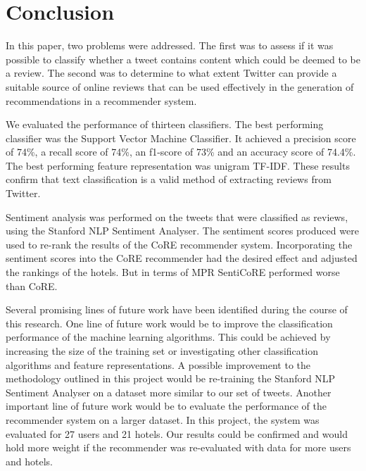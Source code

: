 \section{Conclusion}

In this paper, two problems were addressed. The first was to assess if it was possible to classify whether a tweet contains content which could be deemed to be a review. The second was to determine to what extent Twitter can provide a suitable source of online reviews that can be used effectively in the generation of recommendations in a recommender system.

We evaluated the performance of thirteen classifiers. The best performing classifier was the Support Vector Machine Classifier. It achieved a precision score of 74\%, a recall score of 74\%, an f1-score of 73\% and an accuracy score of 74.4\%. The best performing feature representation was unigram TF-IDF. These results confirm that text classification is a valid method of extracting reviews from Twitter. 

Sentiment analysis was performed on the tweets that were classified as reviews, using the Stanford NLP Sentiment Analyser. The sentiment scores produced were used to re-rank the results of the CoRE recommender system. Incorporating the sentiment scores into the CoRE recommender had the desired effect and adjusted the rankings of the hotels. But in terms of MPR SentiCoRE performed worse than CoRE.

Several promising lines of future work have been identified during the course of this research. One line of future work would be to improve the classification performance of the machine learning algorithms. This could be achieved by increasing the size of the training set or investigating other classification algorithms and feature representations. A possible improvement to the methodology outlined in this project would be re-training the Stanford NLP Sentiment Analyser on a dataset more similar to our set of tweets. Another important line of future work would be to evaluate the performance of the recommender system on a larger dataset. In this project, the system was evaluated for 27 users and 21 hotels. Our results could be confirmed and would hold more weight if the recommender was re-evaluated with data for more users and hotels.

